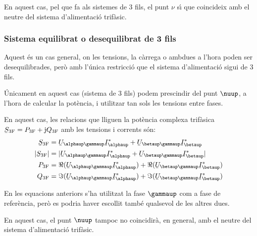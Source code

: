 En aquest cas, pel que fa als sistemes de 3 fils,  el punt $\nu$ s\'{\i}
que coincideix amb el neutre del sistema d'alimentaci\'{o} trif\`{a}sic.

\subsubsection{Sistema equilibrat o desequilibrat de 3 fils}

Aquest \'{e}s un cas  general, on les tensions, la c\`{a}rrega o ambdues a
l'hora  poden ser desequilibrades, per\`{o} amb l'\'{u}nica restricci\'{o} que
el sistema d'alimentaci\'{o} sigui de 3 fils.

 \'{U}nicament en aquest cas (sistema de 3 fils) podem prescindir del punt $\nuup$, a l'hora de
calcular la pot\`{e}ncia, i utilitzar tan sols les tensions entre fases.

En aquest cas, les relacions que lliguen la pot\`{e}ncia complexa
trif\`{a}sica $\cmplx{S}\ped{3F} = P\ped{3F} + \ju Q\ped{3F}$ amb les
tensions i corrents s\'{o}n:
\begin{align}
    \cmplx{S}\ped{3F} &= \cmplx{U}_{\alphaup\gammaup} \cmplx{I}_\alphaup^*
     +  \cmplx{U}_{\betaup\gammaup} \cmplx{I}_\betaup^*  \label{eq:s_3f_3fils}\\
    |\cmplx{S}\ped{3F}| &= |\cmplx{U}_{\alphaup\gammaup} \cmplx{I}_\alphaup^* +
    \cmplx{U}_{\betaup\gammaup} \cmplx{I}_\betaup^*| \\
    P\ped{3F} &= \Re(\cmplx{U}_{\alphaup\gammaup} \cmplx{I}_\alphaup^*) +
    \Re(\cmplx{U}_{\betaup\gammaup} \cmplx{I}_\betaup^*) \\
    Q\ped{3F} &= \Im(\cmplx{U}_{\alphaup\gammaup} \cmplx{I}_\alphaup^*) +
    \Im(\cmplx{U}_{\betaup\gammaup} \cmplx{I}_\betaup^*)
\end{align}

En les equacions anteriors s'ha utilitzat la fase $\gammaup$ com a
fase de refer\`{e}ncia, per\`{o} es podria haver escollit tamb\'{e} qualsevol de
les altres dues.

En aquest cas, el punt $\nuup$ tampoc no coincidir\`{a}, en general, amb
el neutre del sistema d'alimentaci\'{o} trif\`{a}sic.

